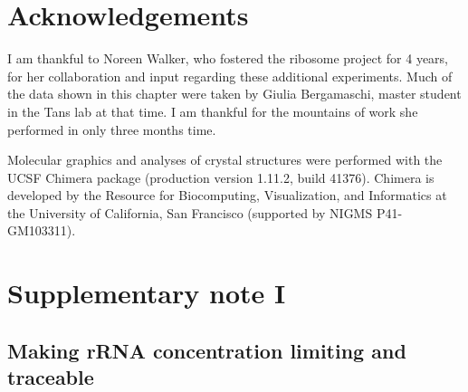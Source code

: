 


\section{Acknowledgements}

%
I am thankful to Noreen Walker, who fostered the ribosome project for 4 years, for her collaboration and input regarding these additional experiments.
%
Much of the data shown in this chapter were taken by Giulia Bergamaschi, master student in the Tans lab at that time. I am thankful for 
the mountains of work she performed in only three months time.

Molecular graphics and analyses 
of crystal structures
%
were performed with the UCSF Chimera package (production version 1.11.2, build 41376). Chimera is developed by the Resource for Biocomputing, Visualization, and Informatics at the University of California, San Francisco (supported by NIGMS P41-GM103311). 





\FloatBarrier
\clearpage

\section{Supplementary note I}
\label{supp:ribo:1}

\subsection{Making rRNA concentration limiting and traceable}

